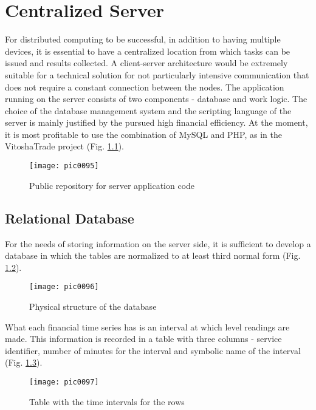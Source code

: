 \newpage
\chapter{Centralized Server}
\label{chapter05}

For distributed computing to be successful, in addition to having multiple devices, it is essential to have a centralized location from which tasks can be issued and results collected. A client-server architecture would be extremely suitable for a technical solution for not particularly intensive communication that does not require a constant connection between the nodes. The application running on the server consists of two components - database and work logic. The choice of the database management system and the scripting language of the server is mainly justified by the pursued high financial efficiency. At the moment, it is most profitable to use the combination of MySQL and PHP, as in the VitoshaTrade\cite{vtrade} project (Fig. \ref{fig:pic0095}).

\begin{figure}[h]
\centering
\texttt{[image: pic0095]}
\caption{Public repository for server application code}
\label{fig:pic0095}
\end{figure}
\FloatBarrier

\section{Relational Database}

For the needs of storing information on the server side, it is sufficient to develop a database in which the tables are normalized to at least third normal form (Fig. \ref{fig:pic0096}).

\begin{figure}[h]
\centering
\texttt{[image: pic0096]}
\caption{Physical structure of the database}
\label{fig:pic0096}
\end{figure}
\FloatBarrier

What each financial time series has is an interval at which level readings are made. This information is recorded in a table with three columns - service identifier, number of minutes for the interval and symbolic name of the interval (Fig. \ref{fig:pic0097}).

\begin{figure}[h]
\centering
\texttt{[image: pic0097]}
\caption{Table with the time intervals for the rows}
\label{fig:pic0097}
\end{figure}
\FloatBarrier

